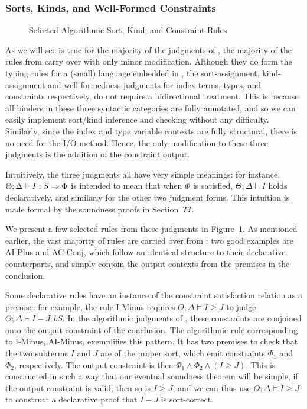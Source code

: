 \subsubsection{Sorts, Kinds, and Well-Formed Constraints}
\begin{figure}

\label{fig:bilambdaamor-selected-sort-kind-constr-rules}
\caption{Selected Algorithmic Sort, Kind, and Constraint Rules}
\end{figure}

As we will see is true for the majority of the judgments of \bilambdaamor, the majority of the rules from \dlambdaamor carry over with only minor modification. Although they do form the typing rules for a (small) language embedded in \bilambdaamor, the sort-assignment, kind-assignment and well-formedness judgments for index terms, types, and constraints respectively, do not require a bidirectional treatment. This is because all binders in these three syntactic categories are fully annotated, and so we can easily implement sort/kind inference and checking without any difficulty. Similarly, since the index and type variable contexts are fully structural, there is no need for the I/O method. Hence, the only modification to these three judgments is the addition of the constraint output.

Intuitively, the three judgments all have very simple meanings: for instance, $\Theta ; \Delta \vdash I : S \Rightarrow \Phi$ is intended to mean that when $\Phi$ is satisfied, $\Theta ; \Delta \vdash I$ holds declaratively, and similarly for the other two judgment forms. This intuition is made formal by the soundness proofs in Section~\textbf{??}.

We present a few selected rules from these judgments in Figure~\ref{fig:bilambdaamor-selected-sort-kind-constr-rules}. As mentioned earlier, the vast majority of rules are carried over from \dlambdaamor: two good examples are AI-Plus and AC-Conj, which follow an identical structure to their declarative counterparts, and simply conjoin the output contexts from the premises in the conclusion.

Some declarative rules have an instance of the constraint satisfaction relation as a premise: for example, the rule I-Minus requires $\Theta ; \Delta \vDash I \geq J$ to judge $\Theta ; \Delta \vdash I - J : bS$. In the algorithmic judgments of \bilambdaamor, these constraints are conjoined onto the output constraint of the conclusion. The algorithmic rule corresponding to I-Minus, AI-Minus, exemplifies this pattern. It has two premises to check that the two subterms $I$ and $J$ are of the proper sort, which emit constraints $\Phi_1$ and $\Phi_2$, respectively. The output constraint is then $\Phi_1 \wedge \Phi_2 \wedge (I \geq J)$. This is constructed in such a way that our eventual soundness theorem will be simple, if the output constraint is valid, then so is $I \geq J$, and we can thus use $\Theta ; \Delta \vDash I \geq J$ to construct a declarative proof that $I - J$ is sort-correct.

